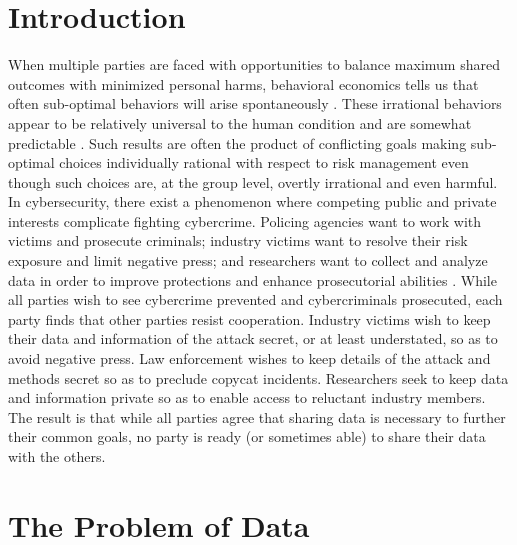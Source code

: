 \section{Introduction}

When multiple parties are faced with opportunities to balance maximum shared outcomes with minimized personal harms, behavioral economics tells us that often sub-optimal behaviors will arise spontaneously \parencite{viscusiBehavioralPublicChoice2015}. These irrational behaviors appear to be  relatively universal to the human condition and are somewhat predictable \parencite{arielyPredictablyIrrationalRevised2010}. Such results are often the product of conflicting goals making sub-optimal choices individually rational with respect to risk management even though such choices are, at the group level, overtly irrational and even harmful. In cybersecurity, there exist a phenomenon where competing public and private interests complicate fighting cybercrime. Policing agencies want to work with victims and prosecute criminals; industry victims want to resolve their risk exposure and limit negative press; and researchers want to collect and analyze data in order to improve protections and enhance prosecutorial abilities \parencite{atapour-abarghoueiResolvingCybersecurityData2020}. While all parties wish to see cybercrime prevented and cybercriminals prosecuted, each party finds that other parties resist cooperation. Industry victims wish to keep their data and information of the attack secret, or at least understated, so as to avoid negative press. Law enforcement wishes to keep details of the attack and methods secret so as to preclude copycat incidents. Researchers seek to keep data and information private so as to enable access to reluctant industry members. The result is that while all parties agree that sharing data is necessary to further their common goals, no party is ready (or sometimes able) to share their data with the others.

\section{The Problem of Data}

